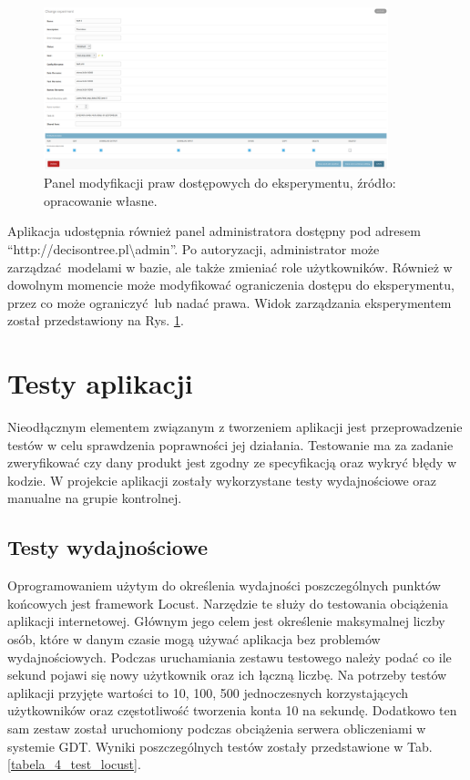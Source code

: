 \begin{figure}[htb]
	\centering
	\includegraphics[angle=270, width=10cm]{grafika/admin_exp.eps}
	\caption{Panel modyfikacji praw dostępowych do eksperymentu, źródło: opracowanie własne.}
	\label{rys20_admin_exp}
\end{figure}

Aplikacja udostępnia również panel administratora dostępny pod adresem \enquote{http://decisontree.pl\textbackslash{admin}}. Po autoryzacji, administrator może zarządzać modelami w bazie, ale także zmieniać role użytkowników. Również w dowolnym momencie może modyfikować ograniczenia dostępu do eksperymentu, przez co może ograniczyć lub nadać prawa. Widok zarządzania eksperymentem został przedstawiony na Rys. \ref{rys20_admin_exp}.

\section{Testy aplikacji}
Nieodłącznym elementem związanym z tworzeniem aplikacji jest przeprowadzenie testów w celu sprawdzenia poprawności jej działania. Testowanie ma za zadanie zweryfikować czy dany produkt jest zgodny ze specyfikacją oraz wykryć błędy w kodzie. W projekcie aplikacji zostały wykorzystane testy wydajnościowe oraz manualne na grupie kontrolnej.
 
\subsection{Testy wydajnościowe}
Oprogramowaniem użytym do określenia wydajności poszczególnych punktów końcowych jest framework Locust. Narzędzie te służy do testowania obciążenia aplikacji internetowej. Głównym jego celem jest określenie maksymalnej liczby osób, które w danym czasie mogą używać aplikacja bez problemów wydajnościowych. Podczas uruchamiania zestawu testowego należy podać co ile sekund pojawi się nowy użytkownik oraz ich łączną liczbę. Na potrzeby testów aplikacji przyjęte wartości to 10, 100, 500 jednoczesnych korzystających użytkowników oraz częstotliwość tworzenia konta 10 na sekundę. Dodatkowo ten sam zestaw został uruchomiony podczas obciążenia serwera obliczeniami w systemie GDT. Wyniki poszczególnych testów zostały przedstawione w Tab. \ref{tabela_4_test_locust}. 

